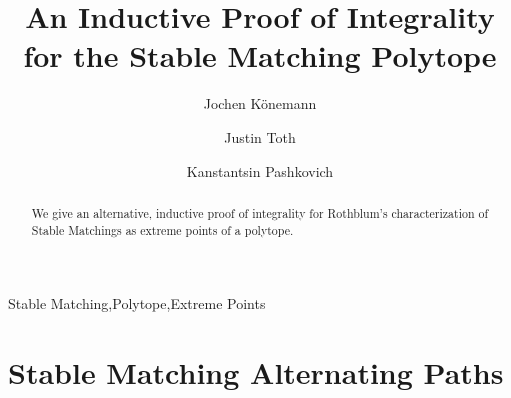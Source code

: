 \documentclass[preprint]{elsarticle}
\begin{document}
\begin{frontmatter}



\title{An Inductive Proof of Integrality for the Stable Matching Polytope}
\author[co]{Jochen K\"{o}nemann}
\author[co]{Justin Toth}
\author[co]{Kanstantsin Pashkovich}
\address[co]{Department of Combinatorics and Optimization, University of Waterloo, Canada}


\begin{abstract}
We give an alternative, inductive proof of integrality for Rothblum's characterization of Stable Matchings as extreme points of a polytope.
\end{abstract}
\begin{keyword}
Stable Matching\sep Polytope\sep Extreme Points
\end{keyword}
\end{frontmatter}
\section{Stable Matching Alternating Paths}
\end{document}
